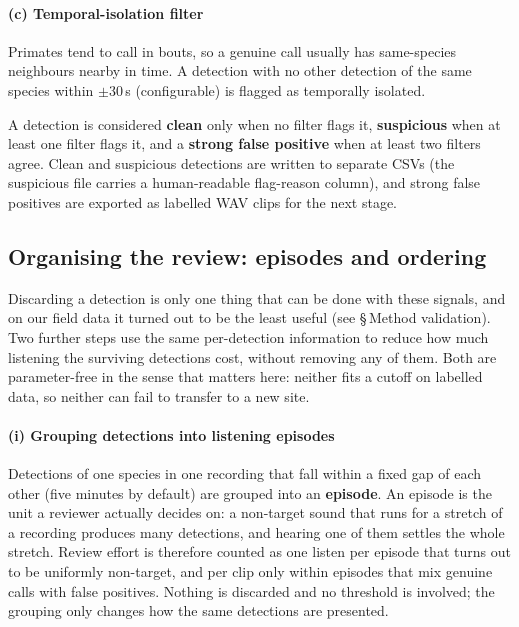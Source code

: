 \documentclass[final,3p,times]{elsarticle}
\begin{document}
\paragraph{(c) Temporal-isolation filter}
Primates tend to call in bouts, so a genuine call usually has same-species
neighbours nearby in time. A detection with no other detection of the same
species within $\pm$30\,s (configurable) is flagged as temporally isolated.

A detection is considered \textbf{clean} only when no filter flags it,
\textbf{suspicious} when at least one filter flags it, and a \textbf{strong
false positive} when at least two filters agree. Clean and suspicious
detections are written to separate CSVs (the suspicious file carries a
human-readable flag-reason column), and strong false positives are
exported as labelled WAV clips for the next stage.

\subsection*{Organising the review: episodes and ordering}

Discarding a detection is only one thing that can be done with these signals,
and on our field data it turned out to be the least useful (see
\S\,Method validation). Two further steps use the same per-detection
information to reduce how much listening the surviving detections cost, without
removing any of them. Both are parameter-free in the sense that matters here:
neither fits a cutoff on labelled data, so neither can fail to transfer to a
new site.

\paragraph{(i) Grouping detections into listening episodes}
Detections of one species in one recording that fall within a fixed gap of each
other (five minutes by default) are grouped into an \textbf{episode}. An
episode is the unit a reviewer actually decides on: a non-target sound that
runs for a stretch of a recording produces many detections, and hearing one of
them settles the whole stretch. Review effort is therefore counted as one
listen per episode that turns out to be uniformly non-target, and per clip only
within episodes that mix genuine calls with false positives. Nothing is
discarded and no threshold is involved; the grouping only changes how the same
detections are presented.
\end{document}
